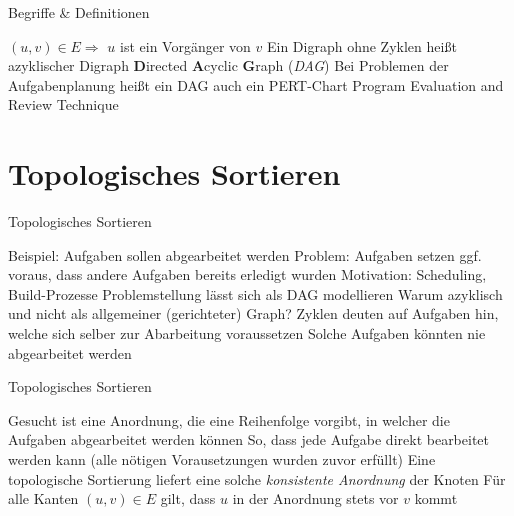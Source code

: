 \documentclass[mathserif]{beamer}
\begin{document}
\begin{frame}{Begriffe \& Definitionen}
    \begin{outline}
        \1 $(u,v)\in E\Longrightarrow$ $u$ ist ein Vorgänger von $v$\pause
        \1 Ein Digraph ohne Zyklen heißt azyklischer Digraph\pause
        \2 \textbf{D}irected \textbf{A}cyclic \textbf{G}raph (\textit{DAG})\pause
        \2 Bei Problemen der Aufgabenplanung heißt ein DAG auch ein PERT-Chart
        \3 Program Evaluation and Review Technique
    \end{outline}
\end{frame}

\section{Topologisches Sortieren}
\begin{frame}{Topologisches Sortieren}
    \begin{outline}
        \1 Beispiel: Aufgaben sollen abgearbeitet werden\pause
        \2 Problem: Aufgaben setzen ggf. voraus, dass andere Aufgaben bereits erledigt wurden\pause
        \2 Motivation: Scheduling, Build-Prozesse\pause
        \1 Problemstellung lässt sich als DAG modellieren\pause
        \2 Warum azyklisch und nicht als allgemeiner (gerichteter) Graph?\pause
        \3 Zyklen deuten auf Aufgaben hin, welche sich selber zur Abarbeitung voraussetzen
        \3 Solche Aufgaben könnten nie abgearbeitet werden
    \end{outline}
\end{frame}
\begin{frame}{Topologisches Sortieren}
    \begin{outline}
        \1 Gesucht ist eine Anordnung, die eine Reihenfolge vorgibt, in welcher die Aufgaben abgearbeitet werden können
        \2 So, dass jede Aufgabe direkt bearbeitet werden kann (alle nötigen Vorausetzungen wurden zuvor erfüllt)\pause
        \1 Eine topologische Sortierung liefert eine solche \textit{konsistente Anordnung} der Knoten\pause
        \1 Für alle Kanten $(u,v)\in E$ gilt, dass $u$ in der Anordnung stets vor $v$ kommt
    \end{outline}
\end{frame}
\end{document}
